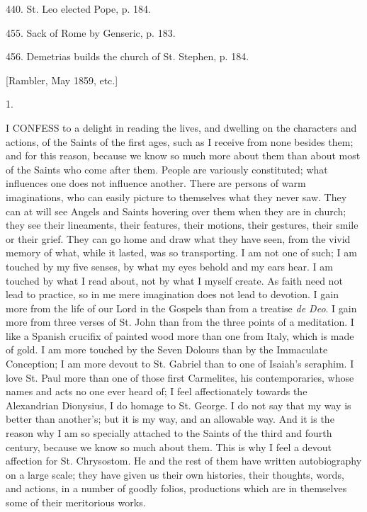 440.
St. Leo elected Pope, p. 184.

455.
Sack of Rome by Genseric, p. 183.

456.
Demetrias builds the church of St. Stephen, p.
184.



[Rambler, May 1859,
etc.]

1.

I CONFESS to a delight in reading the
lives, and dwelling on the characters and actions, of the Saints of
the first ages, such as I receive from none besides them; and for this
reason, because we know so much more about them than about most of the
Saints who come after them. People are variously constituted; what
influences one does not influence another. There are persons of warm
imaginations, who can easily picture to themselves what they never
saw. They can at will see Angels and Saints hovering over them when
they are in church; they see their lineaments, their features, their
motions, their gestures, their smile or their grief. They can go home
and draw what they have seen, from the vivid memory of what, while it
lasted, was so transporting. I am not one of such; I am touched by my
five senses, by what my eyes behold and my ears hear. I am touched by
what I read about, not by what I myself create. As faith need not lead
to practice, so in me mere imagination does not lead to devotion. I
gain more from the life of our Lord in the Gospels than from a
treatise \emph{de Deo}. I gain more from three verses of St. John than
from the three points of a meditation. I like a Spanish crucifix of
painted wood more than one from Italy, which is made of gold. I
am more touched by the Seven Dolours than by the Immaculate
Conception; I am more devout to St. Gabriel than to one of Isaiah's
seraphim. I love St. Paul more than one of those first Carmelites, his
contemporaries, whose names and acts no one ever heard of; I feel
affectionately towards the Alexandrian Dionysius, I do homage to St.
George. I do not say that my way is better than another's; but it is
my way, and an allowable way. And it is the reason why I am so
specially attached to the Saints of the third and fourth century,
because we know so much about them. This is why I feel a devout
affection for St. Chrysostom. He and the rest of them have written
autobiography on a large scale; they have given us their own
histories, their thoughts, words, and actions, in a number of goodly
folios, productions which are in themselves some of their meritorious
works.

